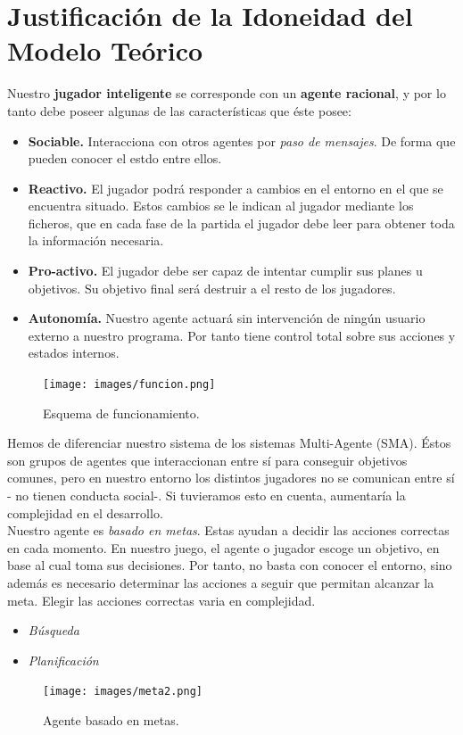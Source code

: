 \documentclass[a4paper,12pt,oneside]{book}
\begin{document}
\chapter{Justificación de la Idoneidad del Modelo Teórico}


Nuestro {\bf jugador inteligente} se corresponde con un {\bf agente racional}, y
por lo tanto debe poseer algunas de las características que éste posee:
\begin{itemize}
\item {\bf Sociable.} Interacciona con otros agentes por {\it paso de
    mensajes}. De forma que pueden conocer el estdo entre ellos.
\item {\bf Reactivo.} El jugador podrá responder a cambios en el
  entorno en el que se encuentra situado. Estos cambios se le indican
  al jugador mediante los ficheros, que en cada fase de la partida el
  jugador debe leer para obtener toda la información necesaria.
\item {\bf Pro-activo.} El jugador debe ser capaz de intentar cumplir
  sus planes u objetivos. Su objetivo final será destruir a el resto
  de los jugadores.
\item {\bf Autonomía.} Nuestro agente actuará sin intervención de
  ningún usuario externo a nuestro programa. Por tanto tiene control
  total sobre sus acciones y estados internos.
\end{itemize}


\begin{figure}[!h]
  \centering
  \texttt{[image: images/funcion.png]}
  \caption{Esquema de funcionamiento.}
\end{figure}


Hemos de diferenciar nuestro sistema de los sistemas Multi-Agente
(SMA). Éstos son grupos de agentes que interaccionan entre sí para
conseguir objetivos comunes, pero en nuestro entorno los distintos
jugadores no se comunican entre sí - no tienen conducta social-. Si
tuvieramos esto en cuenta, aumentaría la complejidad en el
desarrollo.\\

Nuestro agente es {\it basado en metas}. Estas ayudan a decidir las acciones
correctas en cada momento. En nuestro juego, el agente o jugador
escoge un objetivo, en base al cual toma sus decisiones. Por tanto, no
basta con conocer el entorno, sino además es necesario determinar las
acciones a seguir que permitan alcanzar la meta. Elegir las acciones
correctas varia en complejidad.
\begin{itemize}
\item {\it Búsqueda}
\item {\it Planificación}
\end{itemize}
\begin{figure}[!h]
  \centering
  \texttt{[image: images/meta2.png]}
  \caption{Agente basado en metas.}
\end{figure}
\end{document}
